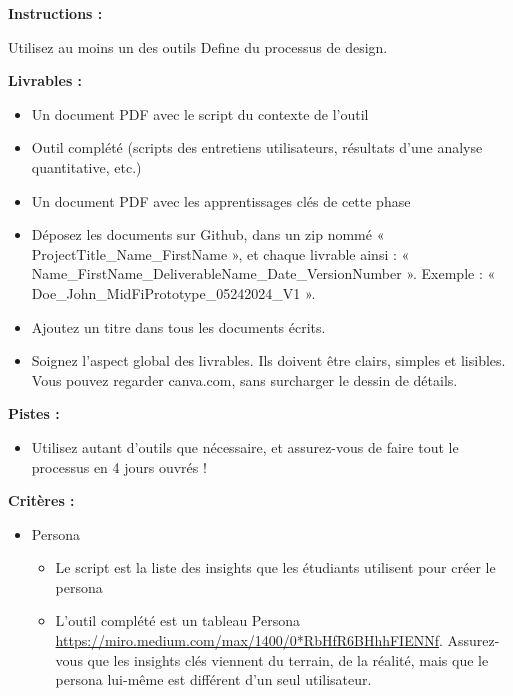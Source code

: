 \makeheaderfiles

\textbf{Instructions :}

Utilisez au moins un des outils Define du processus de design.

\textbf{Livrables :}

\begin{itemize}
\item Un document PDF avec le script du contexte de l'outil
\item Outil complété (scripts des entretiens utilisateurs, résultats d'une analyse quantitative, etc.)
\item Un document PDF avec les apprentissages clés de cette phase
\item Déposez les documents sur Github, dans un zip nommé « ProjectTitle\_Name\_FirstName », et chaque livrable ainsi : « Name\_FirstName\_DeliverableName\_Date\_VersionNumber ». Exemple : « Doe\_John\_MidFiPrototype\_05242024\_V1 ».
\item Ajoutez un titre dans tous les documents écrits.
\item Soignez l'aspect global des livrables. Ils doivent être clairs, simples et lisibles. Vous pouvez regarder canva.com, sans surcharger le dessin de détails.
\end{itemize}

\textbf{Pistes :}

\begin{itemize}
\item Utilisez autant d'outils que nécessaire, et assurez-vous de faire tout le processus en 4 jours ouvrés !
\end{itemize}

\textbf{Critères :}

\begin{itemize}
\item Persona
\begin{itemize}
\item Le script est la liste des insights que les étudiants utilisent pour créer le persona
\item L'outil complété est un tableau Persona \url{https://miro.medium.com/max/1400/0*RbHfR6BHhhFIENNf}. Assurez-vous que les insights clés viennent du terrain, de la réalité, mais que le persona lui-même est différent d'un seul utilisateur.
\end{itemize}
\end{itemize}


